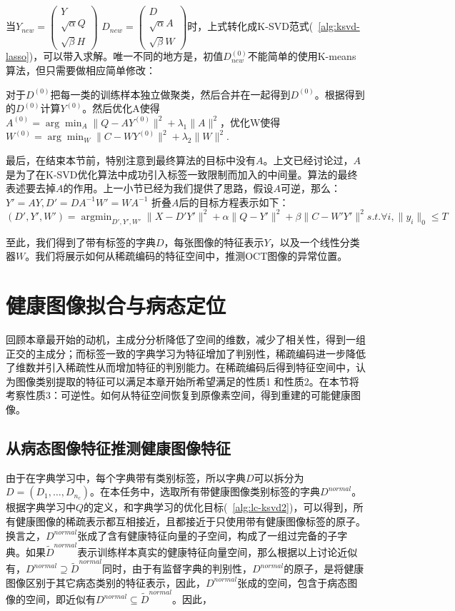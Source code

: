     当$Y_{new} = \begin{pmatrix} Y \\ \sqrt{\alpha} Q \\ \sqrt{\beta}H\end{pmatrix}$ $D_{new} = \begin{pmatrix} D \\ \sqrt{\alpha} A \\ \sqrt{\beta}W\end{pmatrix}$时，上式转化成K-SVD范式(~\ref{alg:ksvd-lasso})，可以带入求解。唯一不同的地方是，初值$D_{new}^{(0)}$不能简单的使用K-means算法，但只需要做相应简单修改\cite{jiang2013label}：

    对于$D^{(0)}$把每一类的训练样本独立做聚类，然后合并在一起得到$D^{(0)}$。根据得到的$D^{(0)}$计算$Y^{(0)}$。然后优化A使得 $A^{(0)} = \arg\min _{A} \|Q - AY^{(0)}\|^2 + \lambda_1 \|A\|^2$，优化W使得$W^{(0)} = \arg\min_{W} \|C - WY^{(0)}\|^2+ \lambda_2\|W\|^2$.

    最后，在结束本节前，特别注意到最终算法的目标中没有$A$。上文已经讨论过，$A$是为了在K-SVD优化算法中成功引入标签一致限制而加入的中间量。算法的最终表述要去掉$A$的作用。上一小节已经为我们提供了思路，假设$A$可逆，那么：$Y' = AY, D' = D A^{-1} W' = W A^{-1}$ 折叠$A$后的目标方程表示如下：
    \begin{equation}
    \label{alg:lc-ksvd3}
    (D', Y', W') = \mathop{\arg\min}_{D', Y', W'} \| X - D'Y'\|^2 + \alpha \|Q - Y'\| ^2 + \beta\|C - W' Y' \| ^2 s.t. \forall i, \|y_i\|_0 \le T 
    \end{equation}

    至此，我们得到了带有标签的字典$D$，每张图像的特征表示$Y$，以及一个线性分类器$W$。我们将展示如何从稀疏编码的特征空间中，推测OCT图像的异常位置。


\section{健康图像拟合与病态定位}
\label{sec:norm-recon}
    回顾本章最开始的动机，主成分分析降低了空间的维数，减少了相关性，得到一组正交的主成分；而标签一致的字典学习为特征增加了判别性，稀疏编码进一步降低了维数并引入稀疏性从而增加特征的判别能力。在稀疏编码后得到特征空间中，认为图像类别提取的特征可以满足本章开始所希望满足的性质1 和性质2。在本节将考察性质3：可逆性。如何从特征空间恢复到原像素空间，得到重建的可能健康图像。

    \subsection{从病态图像特征推测健康图像特征}
    由于在字典学习中，每个字典带有类别标签，所以字典$D$可以拆分为$D = (D_1, \dots, D_{n_c})$。在本任务中，选取所有带健康图像类别标签的字典$D^{normal}$。根据字典学习中$Q$的定义，和字典学习的优化目标(~\ref{alg:lc-ksvd2})，可以得到，所有健康图像的稀疏表示都互相接近，且都接近于只使用带有健康图像标签的原子。换言之，$D^{normal}$张成了含有健康特征向量的子空间，构成了一组过完备的子字典。如果$\tilde{D}^{normal}$表示训练样本真实的健康特征向量空间，那么根据以上讨论近似有，$D^{normal} \supseteq \tilde{D}^{normal}$同时，由于有监督字典的判别性，$D^{normal}$的原子，是将健康图像区别于其它病态类别的特征表示，因此，$D^{normal}$张成的空间，包含于病态图像的空间，即近似有$D^{normal} \subseteq \tilde{D}^{normal}$。因此，

